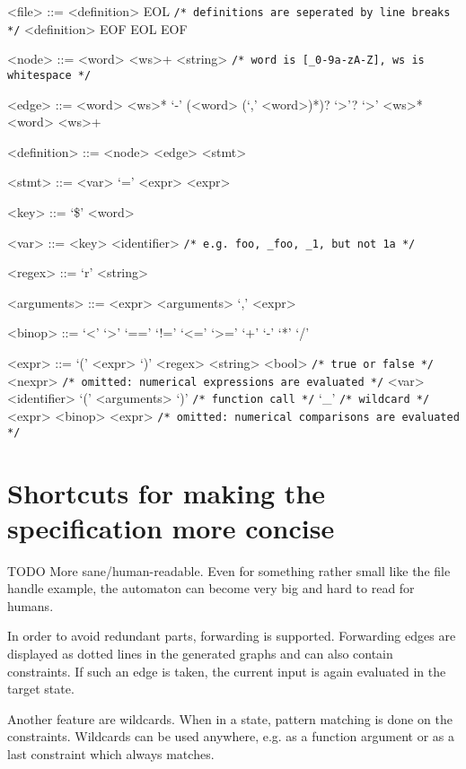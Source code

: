 \begin{grammar}

<file> ::= <definition> EOL \verb|/* definitions are seperated by line breaks */|
\alt <definition> EOF
\alt EOL
\alt EOF

<node> ::= <word> <ws>+ <string> \verb|/* word is [_0-9a-zA-Z], ws is whitespace */|

<edge> ::= <word> <ws>* `-' (<word> (`,' <word>)*)? `>'? `>' <ws>* <word> <ws>+

<definition> ::= <node>
\alt <edge> <stmt>

<stmt> ::= <var> `=' <expr>
\alt <expr>

<key> ::= `\$' <word>

<var> ::= <key>
\alt <identifier> \verb|/* e.g. foo, _foo, _1, but not 1a */|

<regex> ::= `r' <string>

<arguments> ::= <expr>
\alt <arguments> `,' <expr>

<binop> ::= `<' \alt `>' \alt `==' \alt `!=' \alt `<=' \alt `>=' \alt `+' \alt `-' \alt `*' \alt `/'

<expr> ::= `(' <expr> `)'
\alt <regex>
\alt <string>
\alt <bool> \verb|/* true or false */|
\alt <nexpr> \verb|/* omitted: numerical expressions are evaluated */|
\alt <var>
\alt <identifier> `(' <arguments> `)' \verb|/* function call */|
\alt `_' \verb|/* wildcard */|
\alt <expr> <binop> <expr> \verb|/* omitted: numerical comparisons are evaluated */|

\end{grammar}


\section{Shortcuts for making the specification more concise}
TODO More sane/human-readable. %
Even for something rather small like the file handle example, the automaton can become very big and hard to read for humans.

In order to avoid redundant parts, forwarding is supported. Forwarding edges are displayed as dotted lines in the generated graphs and can also contain constraints. If such an edge is taken, the current input is again evaluated in the target state.

Another feature are wildcards. When in a state, pattern matching is done on the constraints. Wildcards can be used anywhere, e.g. as a function argument or as a last constraint which always matches.

